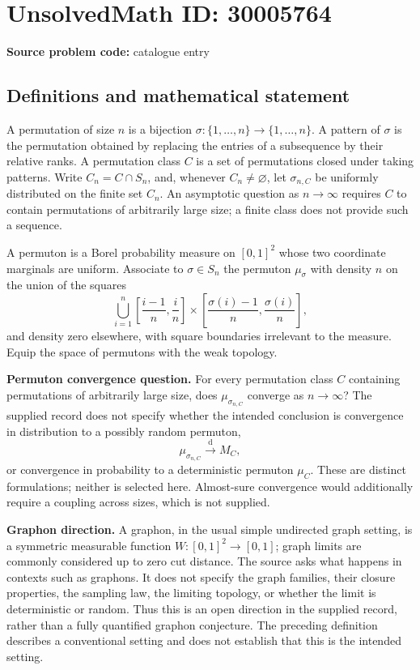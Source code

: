 \documentclass[11pt]{article}
\begin{document}
\section*{UnsolvedMath ID: 30005764}
\textbf{Source problem code:} catalogue entry
\subsection{Definitions and mathematical statement}
A permutation of size \(n\) is a bijection \(\sigma:\{1,\ldots,n\}\to\{1,\ldots,n\}\). A pattern of \(\sigma\) is the permutation obtained by replacing the entries of a subsequence by their relative ranks. A permutation class \(C\) is a set of permutations closed under taking patterns. Write \(C_n=C\cap S_n\), and, whenever \(C_n\ne\varnothing\), let \(\sigma_{n,C}\) be uniformly distributed on the finite set \(C_n\). An asymptotic question as \(n\to\infty\) requires \(C\) to contain permutations of arbitrarily large size; a finite class does not provide such a sequence.

A permuton is a Borel probability measure on \([0,1]^2\) whose two coordinate marginals are uniform. Associate to \(\sigma\in S_n\) the permuton \(\mu_\sigma\) with density \(n\) on the union of the squares
\[
\bigcup_{i=1}^n
\left[\frac{i-1}{n},\frac{i}{n}\right]
\times
\left[\frac{\sigma(i)-1}{n},\frac{\sigma(i)}{n}\right],
\]
and density zero elsewhere, with square boundaries irrelevant to the measure. Equip the space of permutons with the weak topology.

\textbf{Permuton convergence question.} For every permutation class \(C\) containing permutations of arbitrarily large size, does \(\mu_{\sigma_{n,C}}\) converge as \(n\to\infty\)? The supplied record does not specify whether the intended conclusion is convergence in distribution to a possibly random permuton,
\[
\mu_{\sigma_{n,C}}\xrightarrow{\mathrm d}M_C,
\]
or convergence in probability to a deterministic permuton \(\mu_C\). These are distinct formulations; neither is selected here. Almost-sure convergence would additionally require a coupling across sizes, which is not supplied.

\textbf{Graphon direction.} A graphon, in the usual simple undirected graph setting, is a symmetric measurable function \(W:[0,1]^2\to[0,1]\); graph limits are commonly considered up to zero cut distance. The source asks what happens in contexts such as graphons. It does not specify the graph families, their closure properties, the sampling law, the limiting topology, or whether the limit is deterministic or random. Thus this is an open direction in the supplied record, rather than a fully quantified graphon conjecture. The preceding definition describes a conventional setting and does not establish that this is the intended setting.
\end{document}
